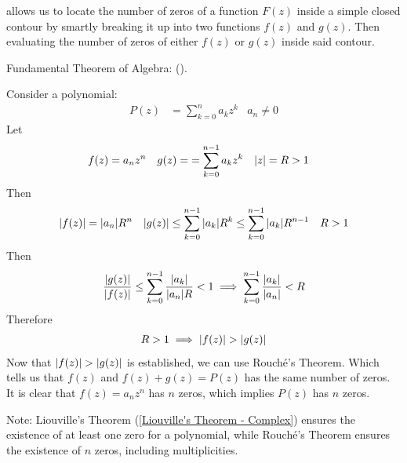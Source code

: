 \documentclass[12pt, english]{book}
\begin{document}
	 allows us to locate the number of zeros of a function \(F(z)\) inside a simple closed contour by smartly breaking it up into two functions \(f(z)\) and \(g(z)\). Then evaluating the number of zeros of either \(f(z)\) or \(g(z)\) inside said contour. 
	
	\begin{example}
		\label{Fundamental Theorem of Algebra via Rouche's Theorem Proof - Complex}
		Fundamental Theorem of Algebra: ().
		
		Consider a polynomial:
		\begin{align*}
			P(z) &= \sum_{k=0}^{n} a_k z^k & a_n \neq 0
		\end{align*}
		Let 
		\begin{align*}
			f(z) &= a_n z^n & g(z) = &= \sum_{k=0}^{n-1} a_k z^k & \abs{z} &= R > 1
		\end{align*}
		Then
		\begin{align*}
			\abs{f(z)} &= \abs{a_n} R^n & 
			\abs{g(z)} &\leq \sum_{k=0}^{n-1} \abs{a_k} R^k \leq \sum_{k=0}^{n-1} \abs{a_k} R^{n-1}
				& R>1 
		\end{align*}
		Then
		\begin{align*}
			\frac{\abs{g(z)}}{\abs{f(z)}} \leq  \sum_{k=0}^{n-1}\frac{\abs{a_k}}{\abs{a_n}R} < 1 
			\implies \sum_{k=0}^{n-1}\frac{\abs{a_k}}{\abs{a_n}} < R
		\end{align*}
		Therefore
		\begin{align*}
			R > 1 \implies \abs{f(z)} > \abs{g(z)}
		\end{align*}
		Now that \(\abs{f(z)} > \abs{g(z)}\) is established, we can use Rouché's Theorem. Which tells us that \(f(z)\) and \(f(z) + g(z) = P(z)\) has the same number of zeros. It is clear that \(f(z) = a_n z^n\) has \(n\) zeros, which implies \(P(z)\) has \(n\) zeros.
	\end{example}
	
	Note: Liouville's Theorem (\cref{Liouville's Theorem - Complex}) ensures the existence of at least one zero for a polynomial, while Rouché's Theorem ensures the existence of \(n\) zeros, including multiplicities.
	
\end{document}
